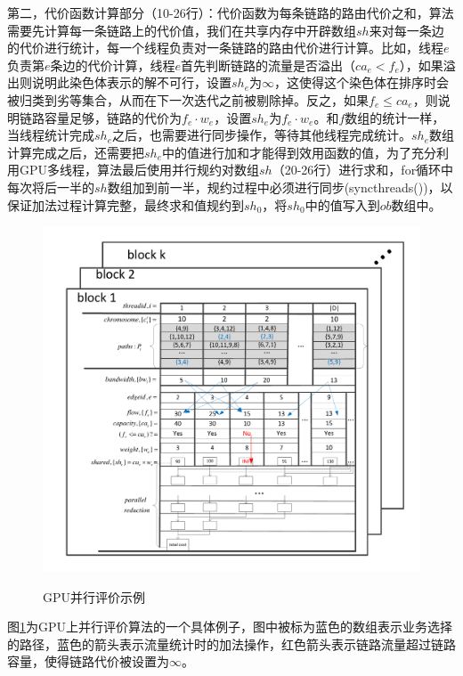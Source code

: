 第二，代价函数计算部分（10-26行）：代价函数为每条链路的路由代价之和，算法需要先计算每一条链路上的代价值，我们在共享内存中开辟数组$sh$来对每一条边的代价进行统计，每一个线程负责对一条链路的路由代价进行计算。比如，线程$e$负责第$e$条边的代价计算，线程$e$首先判断链路的流量是否溢出（$ca_e<f_e$），如果溢出则说明此染色体表示的解不可行，设置$sh_e$为$\infty$，这使得这个染色体在排序时会被归类到劣等集合，从而在下一次迭代之前被剔除掉。反之，如果$f_e \le ca_e$，则说明链路容量足够，链路的代价为$f_e \cdot w_e$，设置$sh_e$为$f_e \cdot w_e$。和$f$数组的统计一样，当线程统计完成$sh_e$之后，也需要进行同步操作，等待其他线程完成统计。$sh_e$数组计算完成之后，还需要把$sh_e$中的值进行加和才能得到效用函数的值，为了充分利用GPU多线程，算法最后使用并行规约对数组$sh$（20-26行）进行求和，for循环中每次将后一半的$sh$数组加到前一半，规约过程中必须进行同步(syncthreads())，以保证加法过程计算完整，最终求和值规约到$sh_0$，将$sh_0$中的值写入到$ob$数组中。
\begin{figure}
\vspace{-0.8cm}
\setlength{\abovecaptionskip}{-0.5cm}
\begin{center}
{\includegraphics[width=1 \textwidth]{figures/GPUfitness.pdf}}
\end{center}
\caption{{\footnotesize{GPU并行评价示例}}}
\label{fitness}
\end{figure}

图\ref{fitness}为GPU上并行评价算法的一个具体例子，图中被标为蓝色的数组表示业务选择的路径，蓝色的箭头表示流量统计时的加法操作，红色箭头表示链路流量超过链路容量，使得链路代价被设置为$\infty$。
